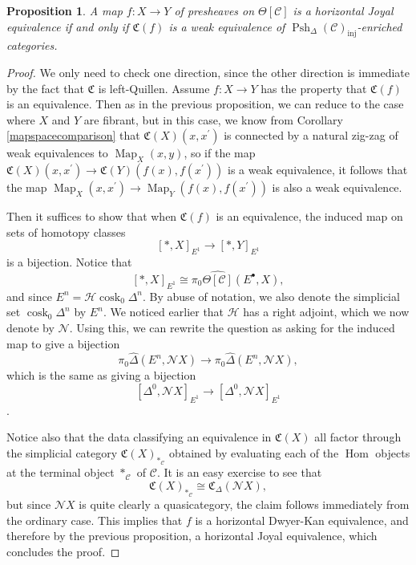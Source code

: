 \documentclass{amsart}
\numberwithin{equation}{section}
\theoremstyle{plain}   %
\newtheorem{prop}[subsection]{Proposition}
\theoremstyle{remark}
\theoremstyle{plain}
\DeclareMathOperator{\Psh}{Psh}
\DeclareMathOperator{\Map}{Map}
\DeclareMathOperator{\Hom}{Hom}
\newcommand{\psh}[1]{\ensuremath{\widehat{#1}}}
\newcommand{\C}{\ensuremath{\mathcal{C}}}
\newcommand{\cellset}{\ensuremath{\widehat{\Theta[\mathcal{C}]}}}
\begin{document}
\begin{prop}\label{conservativity}
	A map \(f:X\to Y\) of presheaves on \(\Theta[\C]\) is a horizontal Joyal equivalence if and only if \(\mathfrak{C}(f)\) is a weak equivalence of \(\Psh_\Delta (\C)_{\mathrm{inj}}\)-enriched categories.
\end{prop}
\begin{proof}
	We only need to check one direction, since the other direction is immediate by the fact that \(\mathfrak{C}\) is left-Quillen.  Assume \(f:X\to Y\) has the property that \(\mathfrak{C}(f)\) is an equivalence. Then as in the previous proposition, we can reduce to the case where \(X\) and \(Y\) are fibrant, but in this case, we know from Corollary \ref{mapspacecomparison} that \(\mathfrak{C}(X)(x,x^\prime)\) is connected by a natural zig-zag of weak equivalences to \(\Map_X(x,y)\), so if the map  \(\mathfrak{C}(X)(x,x^\prime)\to \mathfrak{C}(Y)(f(x),f(x^\prime))\) is a weak equivalence, it follows that the map \(\Map_X(x,x^\prime)\to \Map_Y(f(x),f(x^\prime))\) is also a weak equivalence.

	Then it suffices to show that when \(\mathfrak{C}(f)\) is an equivalence, the induced map on sets of homotopy classes
	\[[\ast,X]_{E^1} \to [\ast,Y]_{E^1}\]
	is a bijection.  Notice that
	\[[\ast,X]_{E^1} \cong \pi_0 \cellset(E^\bullet,X),\]
	and since \(E^n=\mathscr{H}\operatorname{cosk}_0 \Delta^n\). By abuse of notation, we also denote the simplicial set \(\operatorname{cosk}_0 \Delta^n\) by \(E^n\).  We noticed earlier that \(\mathscr{H}\) has a right adjoint, which we now denote by \(\mathscr{N}\). Using this, we can rewrite the question as asking for the induced map to give a bijection
	\[\pi_0 \psh{\Delta}(E^n,\mathscr{N}X) \to \pi_0 \psh{\Delta}(E^n,\mathscr{N}X),\]
	which is the same as giving a bijection
	\[[\Delta^0,\mathscr{N}X]_{E^1}\to [\Delta^0,\mathscr{N}X]_{E^1}\].

	Notice also that the data classifying an equivalence in \(\mathfrak{C}(X)\) all factor through the simplicial category \(\mathfrak{C}(X)_{\ast_\C}\) obtained by evaluating each of the \(\Hom\) objects at the terminal object \(\ast_{\C}\) of \(\C\).  It is an easy exercise to see that
	\[\mathfrak{C}(X)_{\ast_\C} \cong \mathfrak{C}_\Delta (\mathscr{N}X),\]
	but since \(\mathscr{N}X\) is quite clearly a quasicategory, the claim follows immediately from the ordinary case.  This implies that \(f\) is a horizontal Dwyer-Kan equivalence, and therefore by the previous proposition, a horizontal Joyal equivalence, which concludes the proof.
\end{proof}
\end{document}
